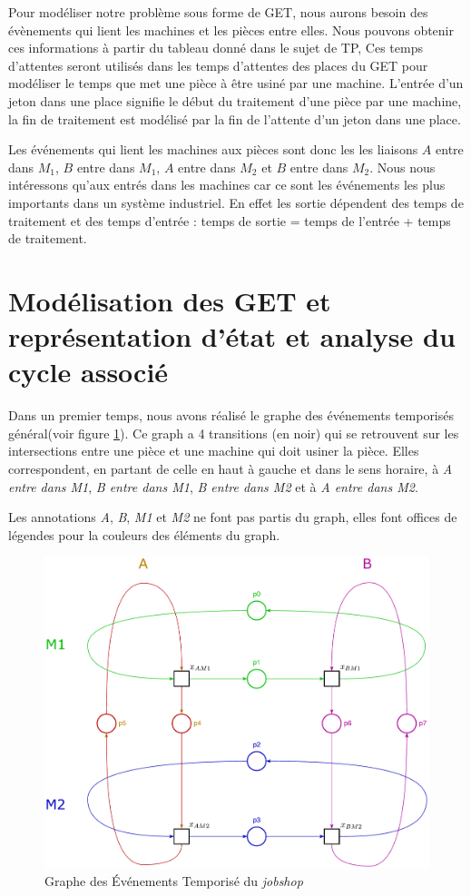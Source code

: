 Pour modéliser notre problème sous forme de GET, nous aurons besoin des évènements qui lient les machines et les pièces entre elles. Nous pouvons obtenir ces informations à partir du tableau donné dans le sujet de TP,  Ces temps d'attentes seront utilisés dans les temps d'attentes des places du GET pour modéliser le temps que met une pièce à être usiné par une machine. L'entrée d'un jeton dans une place signifie le début du traitement d'une pièce par une machine, la fin de traitement est modélisé par la fin de l'attente d'un jeton dans une place. 

Les événements qui lient les machines aux pièces sont donc les les liaisons $A$ entre dans $M_1$, $B$ entre dans $M_1$, $A$ entre dans $M_2$ et $B$ entre dans $M_2$. Nous nous intéressons qu'aux entrés dans les machines car ce sont les événements les plus importants dans un système industriel. En effet les sortie dépendent des temps de traitement et des temps d'entrée : temps de sortie = temps de l'entrée + temps de traitement.

\section{Modélisation des GET et représentation d'état et analyse du cycle associé}

Dans un premier temps, nous avons réalisé le graphe des événements temporisés général(voir figure \ref{fig:get}). Ce graph a 4 transitions (en noir) qui se retrouvent sur les intersections entre une pièce et une machine qui doit usiner la pièce. Elles correspondent, en partant de celle en haut à gauche et dans le sens horaire, à \emph{A entre dans M1}, \emph{B entre dans M1}, \emph{B entre dans M2} et à \emph{A entre dans M2}. 

Les annotations \emph{A}, \emph{B}, \emph{M1} et \emph{M2} ne font pas partis du graph, elles font offices de légendes pour la couleurs des éléments du graph.

\begin{figure}[!ht]
\centering
\includegraphics[width = .75\textwidth]{./II/images/GET.pdf}
\caption{\label{fig:get} Graphe des Événements Temporisé du \emph{jobshop}}
\end{figure}

